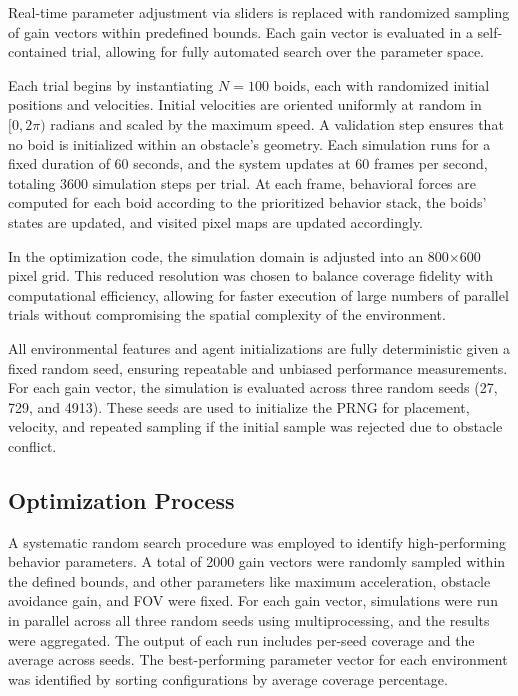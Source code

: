 \documentclass[12pt]{article}
\begin{document}
\begin{linenumbers}
Real-time parameter adjustment via sliders is replaced with randomized sampling of gain vectors within predefined bounds. Each gain vector is evaluated in a self-contained trial, allowing for fully automated search over the parameter space.

Each trial begins by instantiating \(N = 100\) boids, each with randomized initial positions and velocities. Initial velocities are oriented uniformly at random in \([0, 2\pi)\) radians and scaled by the maximum speed. A validation step ensures that no boid is initialized within an obstacle's geometry. Each simulation runs for a fixed duration of 60 seconds, and the system updates at 60 frames per second, totaling 3600 simulation steps per trial. At each frame, behavioral forces are computed for each boid according to the prioritized behavior stack, the boids' states are updated, and visited pixel maps are updated accordingly.

In the optimization code, the simulation domain is adjusted into an 800\(\times\)600 pixel grid. This reduced resolution was chosen to balance coverage fidelity with computational efficiency, allowing for faster execution of large numbers of parallel trials without compromising the spatial complexity of the environment.

All environmental features and agent initializations are fully deterministic given a fixed random seed, ensuring repeatable and unbiased performance measurements. For each gain vector, the simulation is evaluated across three random seeds (27, 729, and 4913). These seeds are used to initialize the PRNG for placement, velocity, and repeated sampling if the initial sample was rejected due to obstacle conflict.

\subsection{Optimization Process}

\sloppypar
A systematic random search procedure was employed to identify high-performing behavior parameters. A total of 2000 gain vectors were randomly sampled within the defined bounds, and other parameters like maximum acceleration, obstacle avoidance gain, and FOV were fixed. For each gain vector, simulations were run in parallel across all three random seeds using multiprocessing, and the results were aggregated. The output of each run includes per-seed coverage and the average across seeds. The best-performing parameter vector for each environment was identified by sorting configurations by average coverage percentage.


\end{linenumbers}
\end{document}
